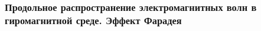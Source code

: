 \subsubsection{Продольное распространение электромагнитных волн в гиромагнитной среде. Эффект Фарадея}
